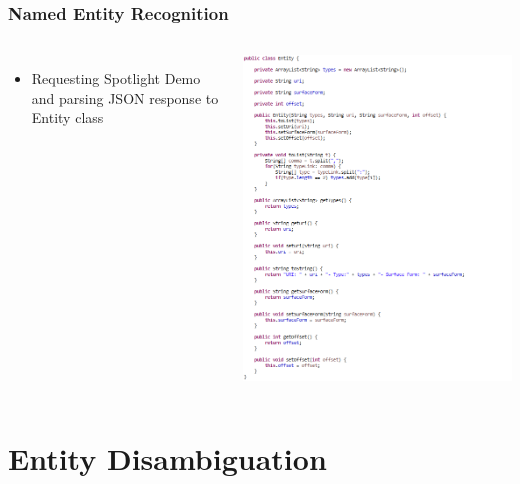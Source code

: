 \documentclass{beamer}
\begin{document}
\begin{frame}
\frametitle{Named Entity Recognition}
\begin{columns}[c]
\begin{itemize}
	\item Requesting Spotlight Demo and parsing JSON response to Entity class
\end{itemize}
\includegraphics[scale=0.4]{Entity.PNG}
\end{columns}
\end{frame}


\section{Entity Disambiguation}
\end{document}
